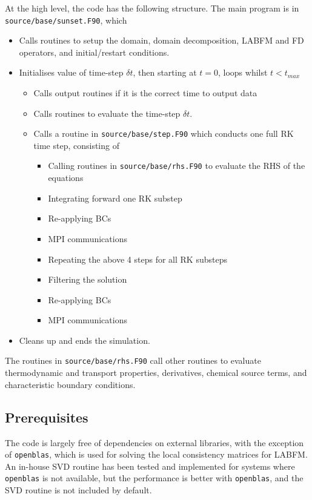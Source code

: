\documentclass[notitlepage]{revtex4-1}
\begin{document}
At the high level, the code has the following structure. The main program is in \verb|source/base/sunset.F90|, which
\begin{itemize}
\item Calls routines to setup the domain, domain decomposition, LABFM and FD operators, and initial/restart conditions.
\item Initialises value of time-step $\delta{t}$, then starting at $t=0$, loops whilst $t<t_{max}$
\begin{itemize}
\item Calls output routines if it is the correct time to output data
\item Calls routines to evaluate the time-step $\delta{t}$.
\item Calls a routine in \verb|source/base/step.F90| which conducts one full RK time step, consisting of
\begin{itemize}
\item Calling routines in \verb|source/base/rhs.F90| to evaluate the RHS of the equations
\item Integrating forward one RK substep
\item Re-applying BCs
\item MPI communications
\item Repeating the above 4 steps for all RK substeps
\item Filtering the solution
\item Re-applying BCs
\item MPI communications
\end{itemize}
\end{itemize}
\item Cleans up and ends the simulation.
\end{itemize}

The routines in \verb|source/base/rhs.F90| call other routines to evaluate thermodynamic and transport properties, derivatives, chemical source terms, and characteristic boundary conditions.

\subsection{Prerequisites}

The code is largely free of dependencies on external libraries, with the exception of \verb|openblas|, which is used for solving the local consistency matrices for LABFM. An in-house SVD routine has been tested and implemented for systems where \verb|openblas| is not available, but the performance is better with \verb|openblas|, and the SVD routine is not included by default.
\end{document}
